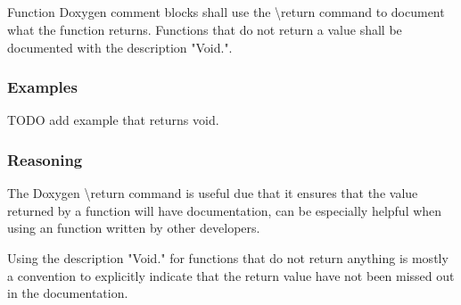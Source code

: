 \subsection*{\doxygenRule{}}

Function Doxygen comment blocks shall use the \textbackslash return command to document what the function returns. Functions that do not return a value shall be documented with the description "Void.".

\subsubsection*{Examples}

\noindent
\begin{minipage}[t]{0.48\textwidth}
    

\end{minipage}\hfill
\begin{minipage}[t]{0.48\textwidth}
    
\end{minipage}

TODO add example that returns void.

\subsubsection*{Reasoning}

The Doxygen \textbackslash return command is useful due that it ensures that the value returned by a function will have documentation, can be especially helpful when using an function written by other developers.

Using the description "Void." for functions that do not return anything is mostly a convention to explicitly indicate that the return value have not been missed out in the documentation.